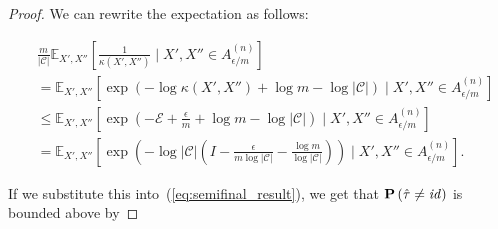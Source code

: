 \begin{proof}
We can rewrite the expectation as follows:

\begin{align}
&\frac{m}{\left\lvert\mathcal{C}\right\rvert} \mathbb{E}_{X', X''}\left[\frac{1}{\kappa\left(X', X''\right)} \mid X', X'' \in A^{(n)}_{\epsilon/m}\right]\\ 
&= \mathbb{E}_{X', X''}\left[\exp\left(- \log\kappa\left(X', X''\right) + \log m - \log \left|\mathcal{C}\right|\right) \mid X', X'' \in A^{(n)}_{\epsilon/m}\right]\\
&\leq \mathbb{E}_{X', X''}\left[\exp\left(- \mathcal{E} + \frac{\epsilon}{m} + \log m - \log \left|\mathcal{C}\right|\right) \mid X', X'' \in A^{(n)}_{\epsilon/m}\right]\\
&= \mathbb{E}_{X', X''}\left[\exp\left(-\log\left|\mathcal{C}\right|\left(I - \frac{\epsilon}{m\log \left|\mathcal{C}\right|} - \frac{\log m}{\log \left|\mathcal{C}\right|}\right)\right) \mid X', X'' \in A^{(n)}_{\epsilon/m}\right].
\end{align}

If we substitute this into~(\ref{eq:semifinal_result}), we get that $\mathbf{P}\left(\hat{\tau} \neq \mathit{id}\right)$ is bounded above by


\end{proof}
